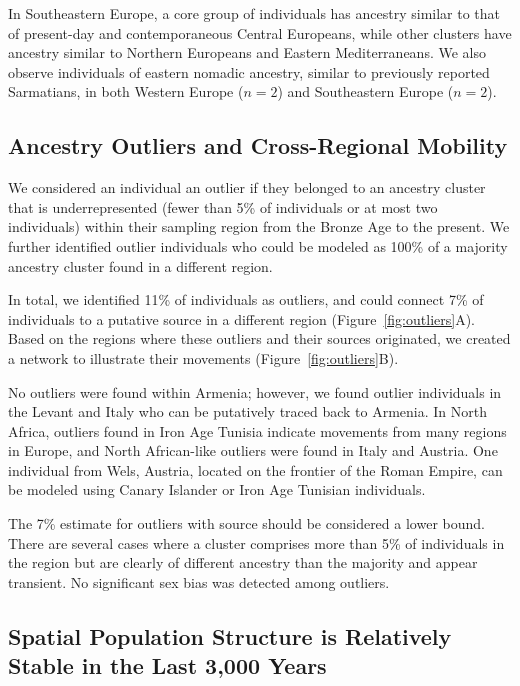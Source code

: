 \documentclass[11pt]{article}
\begin{document}
In Southeastern Europe, a core group of individuals has ancestry similar to that of present-day and contemporaneous Central Europeans, while other clusters have ancestry similar to Northern Europeans and Eastern Mediterraneans. We also observe individuals of eastern nomadic ancestry, similar to previously reported Sarmatians, in both Western Europe ($n=2$) and Southeastern Europe ($n=2$).

\subsection{Ancestry Outliers and Cross-Regional Mobility}

We considered an individual an outlier if they belonged to an ancestry cluster that is underrepresented (fewer than 5\% of individuals or at most two individuals) within their sampling region from the Bronze Age to the present. We further identified outlier individuals who could be modeled as 100\% of a majority ancestry cluster found in a different region.

In total, we identified 11\% of individuals as outliers, and could connect 7\% of individuals to a putative source in a different region (Figure~\ref{fig:outliers}A). Based on the regions where these outliers and their sources originated, we created a network to illustrate their movements (Figure~\ref{fig:outliers}B).

No outliers were found within Armenia; however, we found outlier individuals in the Levant and Italy who can be putatively traced back to Armenia. In North Africa, outliers found in Iron Age Tunisia \citep{Moots2022} indicate movements from many regions in Europe, and North African-like outliers were found in Italy and Austria. One individual from Wels, Austria, located on the frontier of the Roman Empire, can be modeled using Canary Islander or Iron Age Tunisian individuals.

The 7\% estimate for outliers with source should be considered a lower bound. There are several cases where a cluster comprises more than 5\% of individuals in the region but are clearly of different ancestry than the majority and appear transient. No significant sex bias was detected among outliers.

\subsection{Spatial Population Structure is Relatively Stable in the Last 3,000 Years}
\end{document}
